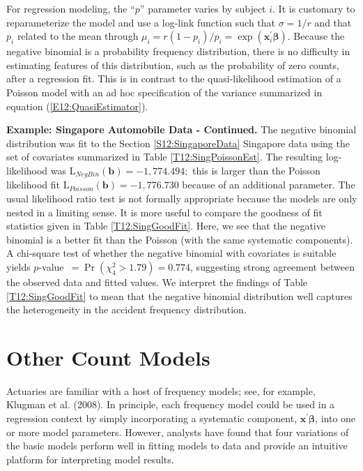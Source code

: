 {For regression modeling, the ``$p$'' parameter varies by subject
$i$. It is customary to reparameterize the model and use a log-link
function such that $\sigma =1/r$ and that $p_i$ related to the mean
through $\mu_i =r(1-p_i)/p_i = \exp (\mathbf{x}_i^{\prime}
\boldsymbol \beta)$. Because the negative binomial is a probability
frequency distribution, there is no difficulty in estimating
features of this distribution, such as the probability of zero
counts, after a regression fit. This is in contrast to the
quasi-likelihood estimation of a Poisson model with an ad hoc
specification of the variance summarized in equation
(\ref{E12:QuasiEstimator}).

\linejed

\textbf{Example: Singapore Automobile Data - Continued.} The
negative binomial distribution was fit to the Section
\ref{S12:SingaporeData} Singapore data using the set of covariates
summarized in Table \ref{T12:SingPoissonEst}. The resulting
log-likelihood was $\mathrm{L}_{NegBin}(\mathbf{b})=-1,774.494;$
this is
larger than the Poisson likelihood fit $\mathrm{L}_{Poisson}\left( \mathbf{b}%
\right) =-1,776.730$ because of an additional parameter. The usual
likelihood ratio test is not formally appropriate because the models
are only nested in a limiting sense. It is more useful to compare
the goodness of fit statistics given in Table \ref{T12:SingGoodFit}.
Here, we see that the negative binomial is a better fit than the
Poisson (with the same systematic components). A chi-square test of
whether the negative binomial with covariates is suitable yields
$p$-value\textrm{\ }$=\Pr \left( \chi_{4}^2>1.79\right) =0.774$,
suggesting strong agreement between the observed data and fitted
values. We interpret the findings of Table \ref{T12:SingGoodFit} to
mean that the negative binomial distribution well captures the
heterogeneity in the accident frequency distribution.

\linejed

\section{Other Count Models}

Actuaries are familiar with a host of frequency models; see, for
example, Klugman et al. (2008). In principle, each frequency model
could be used in a regression context by simply incorporating a
systematic component, $\mathbf{x}^{\prime}\boldsymbol \beta$, into
one or more model parameters. However, analysts have found that four
variations of the basic models perform well in fitting models to
data and provide an intuitive platform for interpreting model
results.

}
